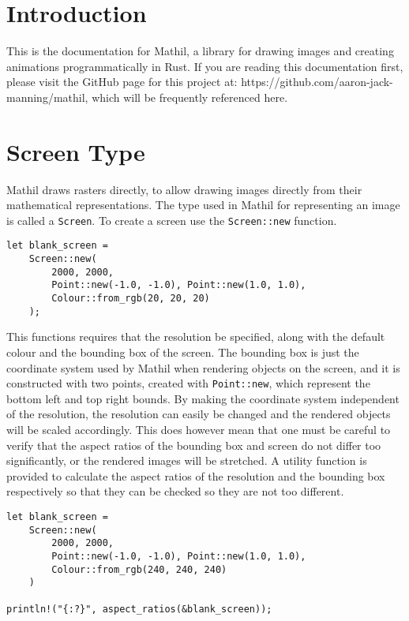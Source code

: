 \section{Introduction}

This is the documentation for Mathil, a library for drawing images and creating animations programmatically in Rust. If you are reading this documentation first, please visit the GitHub page for this project at: https://github.com/aaron-jack-manning/mathil, which will be frequently referenced here.

\section{Screen Type}

Mathil draws rasters directly, to allow drawing images directly from their mathematical representations. The type used in Mathil for representing an image is called a \verb|Screen|. To create a screen use the \verb|Screen::new| function.

\begin{lstlisting}
let blank_screen =
    Screen::new(
        2000, 2000,
        Point::new(-1.0, -1.0), Point::new(1.0, 1.0),
        Colour::from_rgb(20, 20, 20)
    );
\end{lstlisting}

This functions requires that the resolution be specified, along with the default colour and the bounding box of the screen. The bounding box is just the coordinate system used by Mathil when rendering objects on the screen, and it is constructed with two points, created with \verb|Point::new|, which represent the bottom left and top right bounds. By making the coordinate system independent of the resolution, the resolution can easily be changed and the rendered objects will be scaled accordingly. This does however mean that one must be careful to verify that the aspect ratios of the bounding box and screen do not differ too significantly, or the rendered images will be stretched. A utility function is provided to calculate the aspect ratios of the resolution and the bounding box respectively so that they can be checked so they are not too different.

\begin{lstlisting}
let blank_screen =
    Screen::new(
        2000, 2000,
        Point::new(-1.0, -1.0), Point::new(1.0, 1.0),
        Colour::from_rgb(240, 240, 240)
    )

println!("{:?}", aspect_ratios(&blank_screen));
\end{lstlisting}

